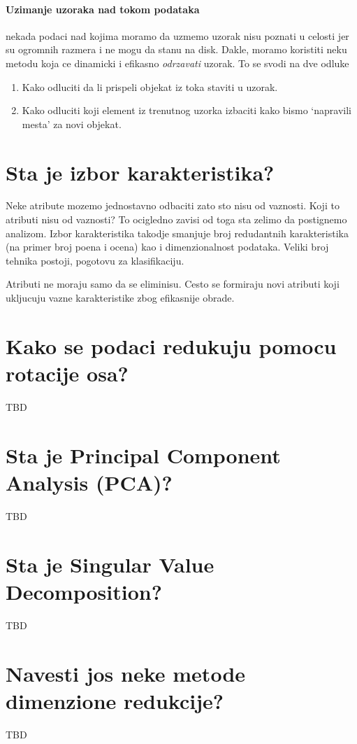 \documentclass[a4paper]{article}
\begin{document}
\paragraph{Uzimanje uzoraka nad tokom podataka} nekada podaci nad kojima moramo da uzmemo uzorak
nisu poznati u celosti jer su ogromnih razmera i ne mogu da stanu na disk. Dakle, moramo koristiti
neku metodu koja ce dinamicki i efikasno \emph{odrzavati} uzorak. To se svodi na dve odluke
\begin{enumerate}
    \item Kako odluciti da li prispeli objekat iz toka staviti u uzorak.
    \item Kako odluciti koji element iz trenutnog uzorka izbaciti kako bismo `napravili mesta' za
        novi objekat.
\end{enumerate}

\section{Sta je izbor karakteristika?}
Neke atribute mozemo jednostavno odbaciti zato sto nisu od vaznosti. Koji to atributi nisu od
vaznosti? To ocigledno zavisi od toga sta zelimo da postignemo analizom. Izbor karakteristika
takodje smanjuje broj redudantnih karakteristika (na primer broj poena i ocena) kao i dimenzionalnost
podataka. Veliki broj tehnika postoji, pogotovu za klasifikaciju.

Atributi ne moraju samo da se eliminisu. Cesto se formiraju novi atributi koji ukljucuju vazne
karakteristike zbog efikasnije obrade.

\section{Kako se podaci redukuju pomocu rotacije osa?}
TBD

\section{Sta je Principal Component Analysis (PCA)?}
TBD

\section{Sta je Singular Value Decomposition?}
TBD

\section{Navesti jos neke metode dimenzione redukcije?}
TBD
\end{document}
